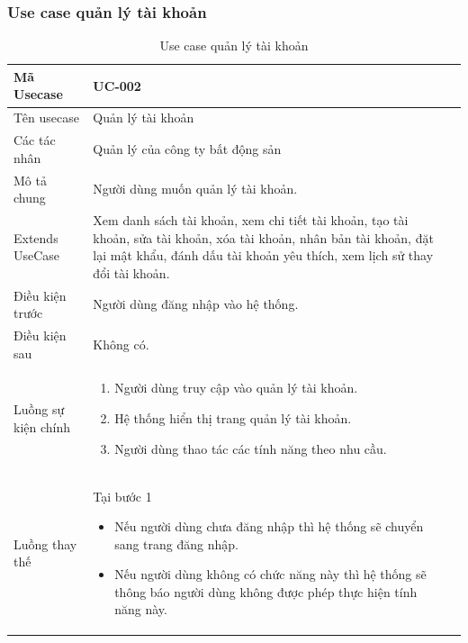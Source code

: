 \documentclass[12pt,a4paper]{article}
\begin{document}
    \subsubsection*{Use case quản lý tài khoản}
    \begin{table}[H]
        \centering
        \begin{tabular}{|p{3.5cm}|p{11.5cm}|c|}
            \hline
            Mã Usecase      & UC-002                             \\
            \hline
            Tên usecase     & Quản lý tài khoản                  \\
            \hline
            Các tác nhân    & Quản lý của công ty bất động sản   \\
            \hline
            Mô tả chung     & Người dùng muốn quản lý tài khoản. \\
            \hline
            Extends UseCase & Xem danh sách tài khoản, xem chi tiết tài khoản, tạo tài khoản, sửa tài khoản, xóa tài khoản, nhân bản tài khoản, đặt lại mật khẩu, đánh dấu tài khoản yêu thích, xem lịch sử thay đổi tài khoản.
            \\
            \hline
            Điều kiện trước & Người dùng đăng nhập vào hệ thống. \\
            \hline

            Điều kiện sau   & Không có.                          \\
            \hline
            Luồng sự kiện chính & \vspace{-.8cm}\begin{enumerate}
                                                    \item Người dùng truy cập vào quản lý tài khoản.
                                                    \item Hệ thống hiển thị trang quản lý tài khoản.
                                                    \item Người dùng thao tác các tính năng theo nhu cầu.
            \end{enumerate}
            \\
            \hline
            Luồng thay thế & Tại bước 1\newline
            \vspace{-.8cm}\begin{itemize}
                              \item Nếu người dùng chưa đăng nhập thì hệ thống sẽ chuyển sang trang đăng nhập.
                              \item Nếu người dùng không có chức năng này thì hệ thống sẽ thông báo người dùng không được phép thực hiện tính năng này.
            \end{itemize}

            \\ \hline
        \end{tabular}
        \caption{Use case quản lý tài khoản}
    \end{table}
\end{document}
